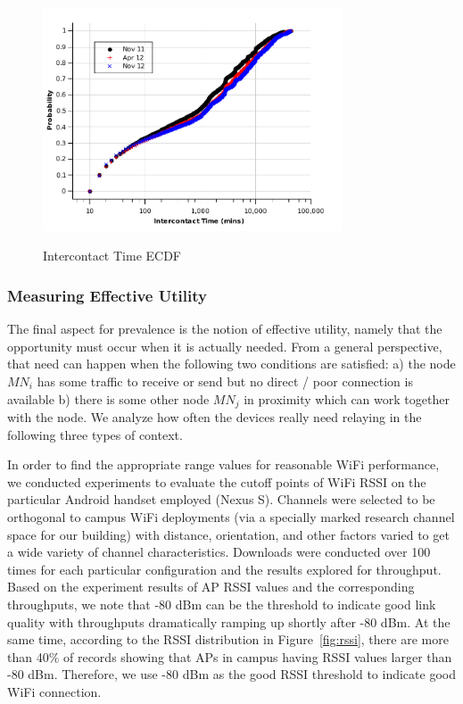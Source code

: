 \begin{figure}[tbp]
\centering 
{\includegraphics[width=3.5in]{graphs/intercontact_cdf.pdf}}
\caption{Intercontact Time ECDF} 
\label{fig:intercontact_cdf}
\end{figure}

\subsubsection{Measuring Effective Utility}
The final aspect for prevalence is the notion of effective utility, namely that the opportunity must occur when it is actually needed.  From a general perspective, that need can happen when the following two conditions are satisfied: a) the node $MN_i$ has some traffic to receive or send but no direct / poor connection is available  b) there is some other node $MN_j$ in proximity which can work together with the node. We analyze how often the devices really need relaying in the following three types of context. 

In order to find the appropriate range values for reasonable WiFi performance, we conducted experiments to evaluate the cutoff points of WiFi RSSI on the particular Android handset employed (Nexus S).  Channels were selected to be orthogonal to campus WiFi deployments (via a specially marked research channel space for our building) with distance, orientation, and other factors varied to get a wide variety of channel characteristics.  Downloads were conducted over 100 times for each particular configuration and the results explored for throughput.  Based on the experiment results of AP RSSI values and the corresponding throughputs, we note that -80 dBm can be the threshold to indicate good link quality with throughputs dramatically ramping up shortly after -80 dBm. At the same time, according to the RSSI distribution in Figure~\ref{fig:rssi}, there are more than 40\% of records showing that APs in campus having RSSI values larger than -80 dBm.  Therefore, we use -80 dBm as the good RSSI threshold to indicate good WiFi connection.  


